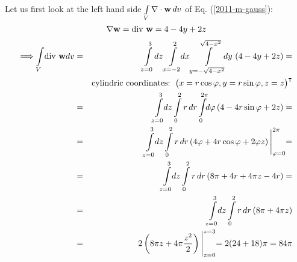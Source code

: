 {\begin{enumerate}
Let us first look at the left hand side $\int \limits_V \nabla \cdot {\bf w} \, dv $
of Eq. (\ref{2011-m-gauss}):
$$
  \nabla {\bf w}=\textrm{div } {\bf w}=4-4y+2z
$$
\begin{eqnarray*}
  \Longrightarrow \int \limits_V \! \textrm{div } {\bf w} dv& = &
  \int \limits_{z=0}^3 \! dz \int \limits_{x=-2}^2 \!\! dx
  \int \limits_{y=-\sqrt{4-x^2}}^{\sqrt{4-x^2}} \!\!\!dy\,
    \left(4-4y+2z\right)= \\
  & & \mbox{cylindric coordinates: }
    \begin{pmatrix}
      x   =   r \cos \varphi ,
      y   =   r \sin \varphi ,
      z   =   z
    \end{pmatrix}^\intercal
   \\
  & = & \int \limits_{z=0}^3 \!\! dz \int \limits_0^2 r\, dr
  \int \limits_0^{2\pi} \!\! d\varphi \left(4-4r \sin \varphi+2z\right)= \\
  & = & \int \limits_{z=0}^3 \!\! dz \int \limits_0^2 r \, dr
  \left(4 \varphi +4r\cos\varphi+2\varphi z\right)
  \Biggl|_{\varphi=0}^{2 \pi}= \\
  & = & \int \limits_{z=0}^3 \!\! dz \int \limits_0^2 r\, dr
  \left(8 \pi +4r+4 \pi z -4r\right)= \\
  & = & \int \limits_{z=0}^3 \!\! dz \int \limits_0^2 r\, dr
  \left(8 \pi +4 \pi z\right) \\
  & = & 2 \left( 8 \pi z +4 \pi \frac{z^2}{2}\right)\Biggl|_{z=0}^{z=3}=
    2 (24+18) \pi = 84 \pi
\end{eqnarray*}


\end{enumerate}}

